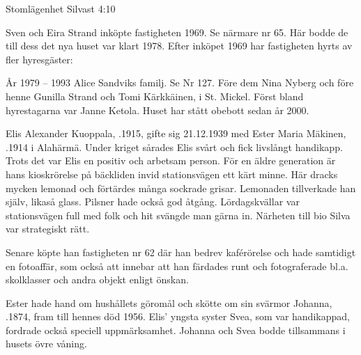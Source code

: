 %

Stomlägenhet Silvast 4:10

%
Sven och Eira Strand inköpte fastigheten 1969. Se närmare nr 65. Här bodde de till dess det nya huset var klart 1978. Efter inköpet 1969 har fastigheten hyrts av fler hyresgäster:

År 1979 – 1993  Alice Sandviks familj. Se Nr 127. Före dem Nina Nyberg och före henne Gunilla Strand och Tomi Kärkkäinen,  i St. Mickel. Först bland hyrestagarna var Janne Ketola. Huset har stått obebott sedan år 2000.



%
Elis Alexander Kuoppala, .1915, gifte sig 21.12.1939 med Ester Maria Mäkinen, .1914 i Alahärmä. Under kriget sårades Elis svårt och fick livslångt handikapp. Trots det var Elis en positiv och arbetsam person. För en äldre generation är hans kioskrörelse på bäckliden invid stationsvägen ett kärt minne. Här dracks mycken lemonad och förtärdes många sockrade grisar. Lemonaden tillverkade han själv, likaså glass. Pilsner hade också god åtgång. Lördagskvällar var stationsvägen full med folk och hit svängde man gärna in. Närheten till bio Silva var strategiskt rätt.

Senare köpte han fastigheten nr 62 där han bedrev kaférörelse och hade samtidigt en fotoaffär, som också att innebar att han färdades runt och fotograferade bl.a. skolklasser och andra objekt enligt önskan.

Ester hade hand om hushållets göromål och skötte om sin svärmor Johanna, .1874, fram till hennes död 1956. Elis' yngsta syster Svea, som var handikappad, fordrade också speciell uppmärksamhet. Johanna och Svea bodde tillsammans i husets övre våning.
\begin{jhchildren}
  \item {}
  \item {}
\end{jhchildren}


